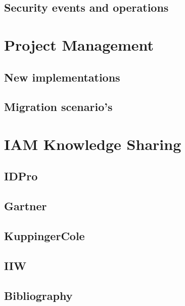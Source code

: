 \hypertarget{security-events-and-operations}{%
\section{Security events and
operations}\label{security-events-and-operations}}

\hypertarget{project-management}{%
\chapter{Project Management}\label{project-management}}

\hypertarget{new-implementations}{%
\section{New implementations}\label{new-implementations}}

\hypertarget{migration-scenarios}{%
\section{Migration scenario's}\label{migration-scenarios}}

\hypertarget{iam-knowledge-sharing}{%
\chapter{IAM Knowledge Sharing}\label{iam-knowledge-sharing}}

\hypertarget{idpro}{%
\section{IDPro}\label{idpro}}

\hypertarget{gartner}{%
\section{Gartner}\label{gartner}}

\hypertarget{kuppingercole}{%
\section{KuppingerCole}\label{kuppingercole}}

\hypertarget{iiw}{%
\section{IIW}\label{iiw}}

\hypertarget{bibliography}{%
\section{Bibliography}\label{bibliography}}

